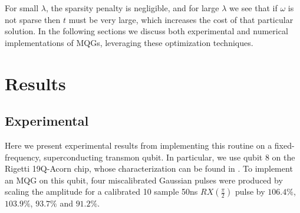\documentclass[aps,nofootinbib,pra,notitlepage,twocolumn]{revtex4-1}
\begin{document}
For small $\lambda$, the sparsity penalty is negligible, and for large $\lambda$ we see that if $\omega$ is not sparse then $t$ must be very large, which increases the cost of that particular solution. In the following sections we discuss both experimental and numerical implementations of MQGs, leveraging these optimization techniques. 

\section{Results} %
\label{sec:results}


\subsection{Experimental} %
\label{sub:experimental}
Here we present experimental results from implementing this routine on a fixed-frequency, superconducting transmon qubit. In particular, we use qubit 8 on the Rigetti 19Q-Acorn chip, whose characterization can be found in \cite{1712.05771}. To implement an MQG on this qubit, four miscalibrated Gaussian pulses were produced by scaling the amplitude for a calibrated 10 sample 50ns $RX(\frac{\pi}{2})$ pulse by $106.4\%$,  $103.9\%$, $93.7\%$ and $91.2\%$.
\end{document}
